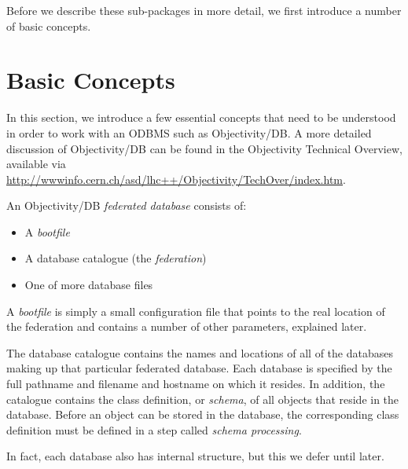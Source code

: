 \par

Before we describe these sub-packages in more detail, we first introduce a number of basic concepts.
\section{Basic Concepts}

\par

In this section, we introduce a few essential concepts that need to be understood
in order to work with an ODBMS such as Objectivity/DB. A more detailed discussion of
Objectivity/DB can be found in the Objectivity Technical Overview, available via
\url{http://wwwinfo.cern.ch/asd/lhc++/Objectivity/TechOver/index.htm}.

\par

An Objectivity/DB \emph{federated database} consists of:

\begin{itemize}

\item A \emph{bootfile}
\item A database catalogue (the \emph{federation})
\item One of more database files\end{itemize}

\par

A \emph{bootfile} is simply a small configuration file that points
to the real location of the federation and contains a number of other
parameters, explained later.
\par

The database catalogue contains the names and locations of all
of the databases making up that particular federated database. 
Each database is specified by the full pathname and filename and hostname on which
it resides. In addition, the catalogue contains the class definition, or \emph{schema},
of all objects that reside in the database. Before an object can be stored in the database,
the corresponding class definition must be defined in a step called \emph{schema processing}.

\par

In fact, each database also has internal structure, but this we defer until later.

\par

